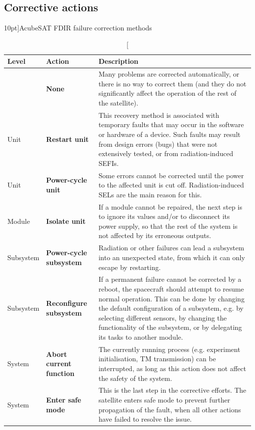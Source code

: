 \documentclass[a4paper,nobib]{tufte-book}
\begin{document}
\clearpage
\subsection{Corrective actions}

\begin{table}[h]
	\centering
	\caption[][10pt]{AcubeSAT \acs{FDIR} failure correction methods}
	\label{tab:fdir_correction}
	\renewcommand{\arraystretch}{1.5}
	\begin{tabularx}{\textwidth}{@{}lL{3cm}X@{}}
		\toprule
		Level & Action & Description \\ \midrule
		& \textbf{None} & Many problems are corrected automatically, or there is no way to correct them (and they do not significantly affect the operation of the rest of the satellite). \\
		Unit & \textbf{Restart unit} & This recovery method is associated with temporary faults that may occur in the software or hardware of a device. Such faults may result from design errors (bugs) that were not extensively tested, or from radiation-induced \acsp{SEFI}. \\
		Unit & \textbf{Power-cycle unit} & Some errors cannot be corrected until the power to the affected unit is cut off. Radiation-induced \acsp{SEL} are the main reason for this. \\
		Module & \textbf{Isolate unit} & If a module cannot be repaired, the next step is to ignore its values and/or to disconnect its power supply, so that the rest of the system is not affected by its erroneous outputs. \\
		Subsystem & \textbf{Power-cycle subsystem} & Radiation or other failures can lead a subsystem into an unexpected state, from which it can only escape by restarting. \\
		Subsystem & \textbf{Reconfigure subsystem} & If a permanent failure cannot be corrected by a reboot, the spacecraft should attempt to resume normal operation. This can be done by changing the default configuration of a subsystem, e.g. by selecting different sensors, by changing the functionality of the subsystem, or by delegating its tasks to another module. \\
		System & \textbf{Abort current function} & The currently running process (e.g. experiment initialisation, \acs{TM} transmission) can be interrupted, as long as this action does not affect the safety of the system. \\
		System & \textbf{Enter safe mode} & This is the last step in the corrective efforts. The satellite enters safe mode to prevent further propagation of the fault, when all other actions have failed to resolve the issue. \\ \bottomrule
	\end{tabularx}
\end{table}
\end{document}
